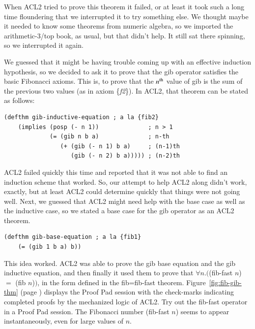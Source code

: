 When ACL2 tried to prove this theorem it failed,
or at least it took such a long time floundering that we interrupted it
to try something else.
We thought maybe it needed to know some theorems from numeric
algebra, so we imported the arithmetic-3/top book, as usual,
but that didn't help. It still sat there spinning,
so we interrupted it again.

We guessed that it might be having trouble coming up with an effective
induction hypothesis, so we decided to ask it to prove that
the \textsf{gib} operator satisfies the basic Fibonacci axioms.
This is, to prove that the $n^\textnormal{th}$ value of \textsf{gib} is
the sum of the previous two values (as in axiom \{\emph{f2}\}).
In ACL2, that theorem can be stated as follows:
\begin{center}
\begin{code}
\begin{verbatim}
(defthm gib-inductive-equation ; a la {fib2}
    (implies (posp (- n 1))              ; n > 1
             (= (gib n b a)              ; n-th
                (+ (gib (- n 1) b a)     ; (n-1)th
                   (gib (- n 2) b a))))) ; (n-2)th
\end{verbatim}
\end{code}
\end{center}

ACL2 failed quickly this time and reported that it was not able
to find an induction scheme that worked.
So, our attempt to help ACL2 along didn't work, exactly, %
but at least ACL2 could determine quickly that
things were not going well.
Next, we guessed that ACL2 might need help with the
base case as well as the inductive case, so we
stated a base case for the \textsf{gib} operator as an ACL2 theorem.
\begin{center}
\begin{code}
\begin{verbatim}
(defthm gib-base-equation ; a la {fib1}
    (= (gib 1 b a) b))
\end{verbatim}
\end{code}
\end{center}

This idea worked. ACL2 was able to prove the gib base equation
and the gib inductive equation, and then finally it
used them to prove that $\forall n.($\textsf{(fib-fast $n$)} $=$ \textsf{(fib $n$)}$)$,
in the form defined in the \textsf{fib=fib-fast} theorem.
Figure~\ref{fig:fib-gib-thm} (page \pageref{fig:fib-gib-thm})
displays the Proof Pad session with the check-marks
indicating completed proofs by the mechanized logic of ACL2.
Try out the \textsf{fib-fast} operator in a Proof Pad session.
The Fibonacci number \textsf{(fib-fast $n$)} seems to appear
instantaneously, even for large values of $n$.

